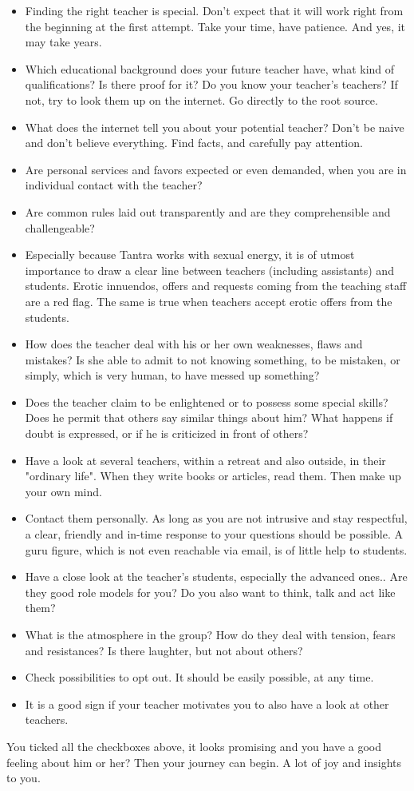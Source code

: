 \begin{itemize}
\item Finding the right teacher is special. Don't expect that it will work right from the beginning at the first attempt. Take your time, have patience. And yes, it may take years.
\item Which educational background does your future teacher have, what kind of qualifications? Is there proof for it? Do you know your teacher's teachers? If not, try to look them up on the internet. Go directly to the root source.
\item What does the internet tell you about your potential teacher? Don't be naive and don’t believe everything. Find facts, and carefully pay attention.
\item Are personal services and favors expected or even demanded, when you are in individual contact with the teacher?
\item Are common rules laid out transparently and are they comprehensible and challengeable?
\item Especially because Tantra works with sexual energy, it is of utmost importance to draw a clear line between teachers (including assistants) and students. Erotic innuendos, offers and requests coming from the teaching staff are a red flag. The same is true when teachers accept erotic offers from the students.
\item How does the teacher deal with his or her own weaknesses, flaws and mistakes? Is she able to admit to not knowing something, to be mistaken, or simply, which is very human, to have messed up something?
\item Does the teacher claim to be enlightened or to possess some special skills? Does he permit that others say similar things about him? What happens if doubt is expressed, or if he is criticized in front of others?
\item Have a look at several teachers, within a retreat and also outside, in their "ordinary life". When they write books or articles, read them. Then make up your own mind.
\item Contact them personally. As long as you are not intrusive and stay respectful, a clear, friendly and in-time response to your questions should be possible. A guru figure, which is not even reachable via email, is of little help to students.
\item Have a close look at the teacher’s students, especially the advanced ones.. Are they good role models for you? Do you also want to think, talk and act like them?
\item What is the atmosphere in the group? How do they deal with tension, fears and resistances? Is there laughter, but not about others?
\item Check possibilities to opt out. It should be easily possible, at any time.
\item It is a good sign if your teacher motivates you to also have a look at other teachers.
\end{itemize}

You ticked all the checkboxes above, it looks promising and you have a good feeling about him or her? Then your journey can begin. A lot of joy and insights to you.
